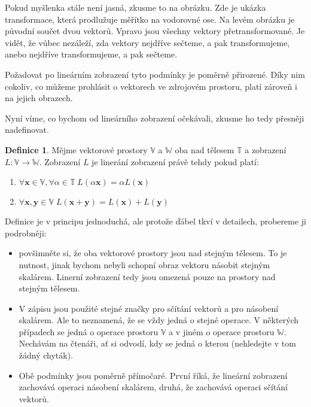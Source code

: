 \documentclass[a5paper,12pt]{amsbook}
\theoremstyle{definition}
\newtheorem{definition}{Definice}[chapter]
\newcommand{\myscalar}[1]{#1}
\newcommand{\myvec}[1]{\mathbf{#1}}
\newcommand{\myspace}[1]{\mathbb{#1}}
\newcommand{\mymap}[1]{#1}
\begin{document}
Pokud myšlenka stále není jasná, zkusme to na obrázku. Zde je ukázka transformace, která prodlužuje
měřítko na vodorovné ose. Na levém obrázku je původní součet dvou vektorů. Vpravo jsou všechny vektory
přetransformované. Je vidět, že vůbec nezáleží, zda vektory nejdříve sečteme, a pak transformujeme,
anebo nejdříve transformujeme, a pak sečteme.

\begin{center}

\end{center}

\noindent Požadovat po lineárním zobrazení tyto podmínky je poměrně přirozené. Díky nim cokoliv, co můžeme
prohlásit o vektorech ve zdrojovém prostoru, platí zároveň i na jejich obrazech.

Nyní víme, co bychom od lineárního zobrazení očekávali, zkusme ho tedy přesněji nadefinovat.

\begin{definition}
Mějme vektorové prostory $\myspace{V}$ a $\myspace{W}$ oba nad tělesem $\myspace{T}$ a zobrazení
$\mymap{L}: \myspace{V}\rightarrow\myspace{W}$. Zobrazení $\mymap{L}$ je linerání zobrazení právě tehdy
pokud platí:

\begin{enumerate}
  \item $\forall\myvec{x}\in\myspace{V},\forall\myscalar{\alpha}\in\myspace{T}\;
    \mymap{L}(\myscalar{\alpha}\myvec{x})=\myscalar{\alpha}L(\myvec{x})$
  \item $\forall\myvec{x},\myvec{y}\in\myspace{V}\;\mymap{L}(\myvec{x}+\myvec{y})
    =\mymap{L}(\myvec{x})+\mymap{L}(\myvec{y})$
\end{enumerate}

\end{definition}

\noindent Definice je v principu jednoduchá, ale protože ďábel tkví v detailech, probereme ji podrobněji:

\begin{itemize}
  \item povšimněte si, že oba vektorové prostory jsou nad stejným tělesem. To je nutnost, jinak bychom
    nebyli schopní obraz vektoru násobit stejným skalárem. Linerní zobrazení tedy jsou omezená pouze
    na prostory nad stejným tělesem.
  \item V zápisu jsou použité stejné značky pro sčítání vektorů a pro násobení skalárem. Ale to neznamená,
    že se vždy jedná o stejné operace. V některých případech se jedná o operace prostoru $\myspace{V}$
    a v jiném o operace prostoru $\myspace{W}$. Nechávám na čtenáři, ať si odvodí, kdy se jedná o kterou
    (nehledejte v tom žádný chyták).
  \item Obě podmínky jsou poměrně přímočaré. První říká, že lineární zobrazení zachovává operaci násobení
    skalárem, druhá, že zachovává operaci sčítání vektorů.
\end{itemize}
\end{document}
